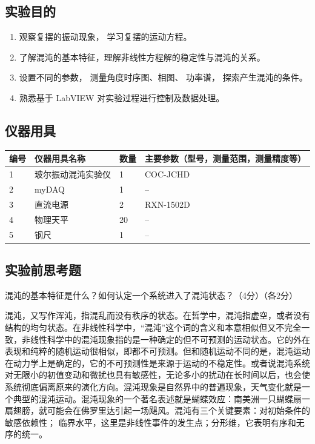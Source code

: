 \documentclass[dvipsnames, svgnames,a4paper,11pt]{article}
\begin{document}
	\subsection{实验目的}
	\begin{enumerate}
		\item 观察复摆的振动现象， 学习复摆的运动方程。
		
		\item 了解混沌的基本特征，理解非线性方程解的稳定性与混沌的关系。
		
		\item 设置不同的参数， 测量角度时序图、相图、 功率谱， 探索产生混沌的条件。
		
		\item 熟悉基于 LabVIEW 对实验过程进行控制及数据处理。
	\end{enumerate}
	
	\subsection{仪器用具}
	\begin{table}[htbp]
		\centering
		\renewcommand\arraystretch{1.6}
		\begin{tabular}{p{}|p{}|p{}|p{}}
			\hline
			编号& 仪器用具名称 & 数量 &  主要参数（型号，测量范围，测量精度等） \\
			\hline
			1& 玻尔振动混沌实验仪 & 1 & COC-JCHD \\
			
			2& myDAQ & 1 & -- \\
			
			3& 直流电源 & 2 & RXN-1502D \\
			
			4& 物理天平 & 20 & -- \\
			
			5& 钢尺 & 1 & -- \\
			\hline
		\end{tabular}
	\end{table}
	
	\subsection{实验前思考题}
	\begin{question}
		混沌的基本特征是什么？如何认定一个系统进入了混沌状态？（4分）（各2分）
	\end{question}
	混沌，又写作浑沌，指混乱而没有秩序的状态。在哲学中，混沌指虚空，或者没有结构的均匀状态。在非线性科学中，“混沌”这个词的含义和本意相似但又不完全一致，非线性科学中的混沌现象指的是一种确定的但不可预测的运动状态。它的外在表现和纯粹的随机运动很相似，即都不可预测。但和随机运动不同的是，混沌运动在动力学上是确定的，它的不可预测性是来源于运动的不稳定性。或者说混沌系统对无限小的初值变动和微扰也具有敏感性，无论多小的扰动在长时间以后，也会使系统彻底偏离原来的演化方向。混沌现象是自然界中的普遍现象，天气变化就是一个典型的混沌运动。混沌现象的一个著名表述就是蝴蝶效应：南美洲一只蝴蝶扇一扇翅膀，就可能会在佛罗里达引起一场飓风。混沌有三个关键要素：对初始条件的敏感依赖性；
	临界水平，这里是非线性事件的发生点；分形维，它表明有序和无序的统一。
	
\end{document}
